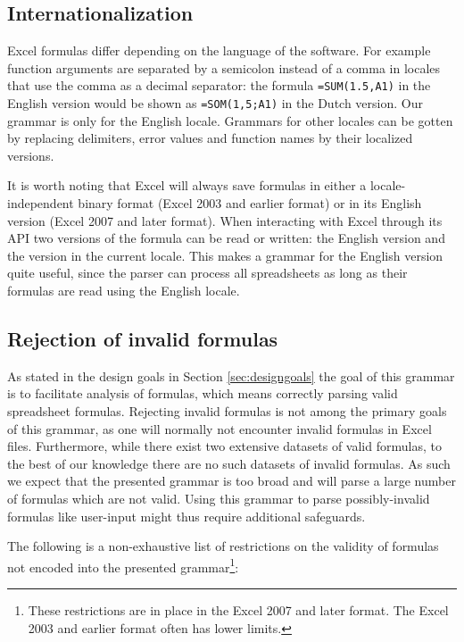 \documentclass[conference]{IEEEtran}
\begin{document}
\subsection{Internationalization}

Excel formulas differ depending on the language of the software. For example function arguments are separated by a semicolon instead of a comma in locales that use the comma as a decimal separator: the formula \texttt{=SUM(1.5,A1)} in the English version would be shown as \texttt{=SOM(1,5;A1)} in the Dutch version.
Our grammar is only for the English locale.
Grammars for other locales can be gotten by replacing delimiters, error values and function names by their localized versions.

It is worth noting that Excel will always save formulas in either a locale-independent binary format (Excel 2003 and earlier format) or in its English version (Excel 2007 and later format). When interacting with Excel through its API two versions of the formula can be read or written: the English version and the version in the current locale.
This makes a grammar for the English version quite useful, since the parser can process all spreadsheets as long as their formulas are read using the English locale.

\subsection{Rejection of invalid formulas}

As stated in the design goals in Section \ref{sec:designgoals} the goal of this grammar is to facilitate analysis of formulas, which means correctly parsing valid spreadsheet formulas.
Rejecting invalid formulas is not among the primary goals of this grammar, as one will normally not encounter invalid formulas in Excel files.
Furthermore, while there exist two extensive datasets of valid formulas, to the best of our knowledge there are no such datasets of invalid formulas.
As such we expect that the presented grammar is too broad and will parse a large number of formulas which are not valid.
Using this grammar to parse possibly-invalid formulas like user-input might thus require additional safeguards.

The following is a non-exhaustive list of restrictions on the validity of formulas not encoded into the presented grammar\footnote{These restrictions are in place in the Excel 2007 and later format. The Excel 2003 and earlier format often has lower limits.}:
\end{document}
